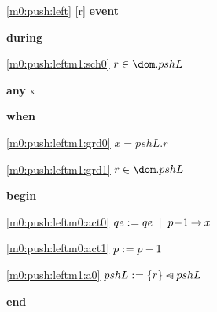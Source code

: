 \noindent \ref{m0:push:left} [r] \textbf{event}
\begin{block}
  \item   \textbf{during}
  \begin{block}
  \item[ \eqref{m0:push:leftm1:sch0} ]$r \in \dom.pshL $ %
  \end{block}
  \item   \textbf{any} x
  \item   \textbf{when}
  \begin{block}
  \item[ \eqref{m0:push:leftm1:grd0} ]$x = pshL.r $ %
  \item[ \eqref{m0:push:leftm1:grd1} ]$r \in \dom.pshL $ %
  \end{block}
  \item   \textbf{begin}
  \begin{block}
  \item[ \eqref{m0:push:leftm0:act0} ]$qe \mathrel{:\mkern1mu=} qe \; \; | \; \; p\! - \!1 \mathbin\rightarrow x $ %
  \item[ \eqref{m0:push:leftm0:act1} ]$p \mathrel{:\mkern1mu=} p-1 $ %
  \item[ \eqref{m0:push:leftm1:a0} ]$pshL \mathrel{:\mkern1mu=} \{ r \} \mathbin{\lhd\mkern-14mu-} pshL $ %
  \end{block}
  \item   \textbf{end} \\
\end{block}

